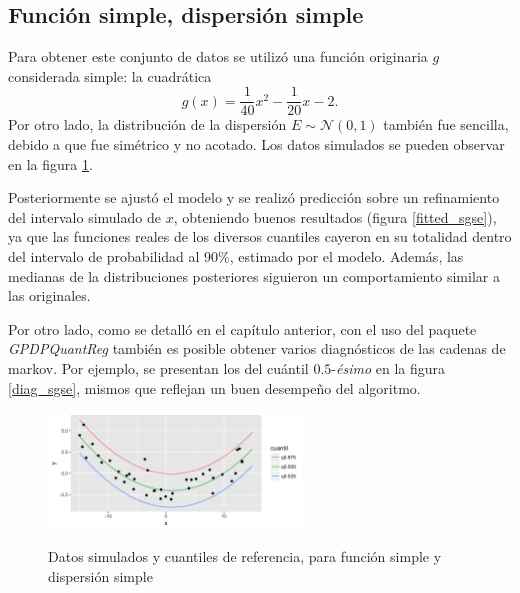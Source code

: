 \subsection{Funci\'on simple, dispersi\'on simple}

Para obtener este conjunto de datos se utiliz\'o una funci\'on originaria $g$ considerada simple: la cuadr\'atica
\begin{equation*}
    g(x) = \frac{1}{40}x^2 - \frac{1}{20}x - 2.
\end{equation*}
Por otro lado, la distribuci\'on de la dispersi\'on $E \sim \mathcal{N}(0,1)$ tambi\'en fue sencilla, debido a que fue sim\'etrico y no acotado. Los datos simulados se pueden observar en la figura \ref{sample_sgse}.

Posteriormente se ajust\'o el modelo y se realiz\'o predicci\'on sobre un refinamiento del intervalo simulado de $x$, obteniendo buenos resultados (figura \ref{fitted_sgse}), ya que las funciones reales de los diversos cuantiles cayeron en su totalidad dentro del intervalo de probabilidad al 90\%, estimado por el modelo. Adem\'as, las medianas de la distribuciones posteriores siguieron un comportamiento similar a las originales.

Por otro lado, como se detall\'o en el cap\'itulo anterior, con el uso del paquete \textit{GPDPQuantReg} tambi\'en es posible obtener varios diagn\'osticos de las cadenas de markov. Por ejemplo, se presentan los del cu\'antil $0.5$-\textit{\'esimo} en la figura \ref{diag_sgse}, mismos que reflejan un buen desempeño del algoritmo.

\begin{figure}[H]
	\centering
	\caption{Datos simulados y cuantiles de referencia, para funci\'on simple y dispersi\'on simple}
	\includegraphics[width=0.60\textwidth]{Figures/Simulation/simple_g_simple_error/sample.png}
	\label{sample_sgse}
\end{figure}

